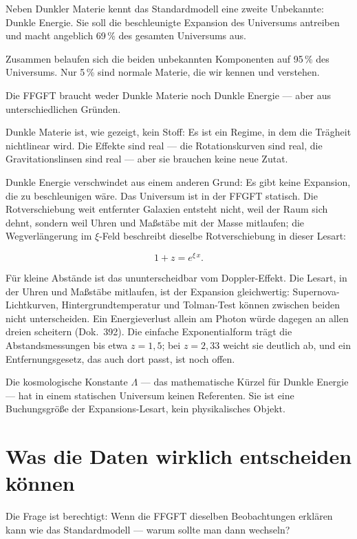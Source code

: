 \documentclass[11pt,oneside]{book}
\begin{document}
Neben Dunkler Materie kennt das Standardmodell eine zweite
Unbekannte: Dunkle Energie. Sie soll die beschleunigte
Expansion des Universums antreiben und macht angeblich 69\,\%
des gesamten Universums aus.

Zusammen belaufen sich die beiden unbekannten Komponenten auf
95\,\% des Universums. Nur 5\,\% sind normale Materie, die
wir kennen und verstehen.

Die FFGFT braucht weder Dunkle Materie noch Dunkle Energie —
aber aus unterschiedlichen Gründen.

Dunkle Materie ist, wie gezeigt, kein Stoff: Es ist ein Regime,
in dem die Trägheit nichtlinear wird. Die Effekte sind real —
die Rotationskurven sind real, die Gravitationslinsen sind real
— aber sie brauchen keine neue Zutat.

Dunkle Energie verschwindet aus einem anderen Grund: Es gibt
keine Expansion, die zu beschleunigen wäre. Das Universum ist
in der FFGFT statisch. Die Rotverschiebung weit entfernter
Galaxien entsteht nicht, weil der Raum sich dehnt, sondern
weil Uhren und Maßstäbe mit der Masse mitlaufen; die
Wegverlängerung im $\xi$-Feld beschreibt dieselbe
Rotverschiebung in dieser Lesart:

\[
  1 + z = e^{\xi\,x} .
\]

Für kleine Abstände ist das ununterscheidbar vom Doppler-Effekt.
Die Lesart, in der Uhren und Maßstäbe mitlaufen, ist der
Expansion gleichwertig: Supernova-Lichtkurven,
Hintergrundtemperatur und Tolman-Test können zwischen beiden
nicht unterscheiden. Ein Energieverlust allein am Photon würde
dagegen an allen dreien scheitern (Dok.~392). Die einfache
Exponentialform trägt die Abstandsmessungen bis etwa $z=1{,}5$;
bei $z=2{,}33$ weicht sie deutlich ab, und ein Entfernungsgesetz,
das auch dort passt, ist noch offen.

Die kosmologische Konstante $\Lambda$ — das mathematische
Kürzel für Dunkle Energie — hat in einem statischen Universum
keinen Referenten. Sie ist eine Buchungsgröße der
Expansions-Lesart, kein physikalisches Objekt.

\chapter{Was die Daten wirklich entscheiden können}

Die Frage ist berechtigt: Wenn die FFGFT dieselben Beobachtungen
erklären kann wie das Standardmodell — warum sollte man dann
wechseln?
\end{document}
